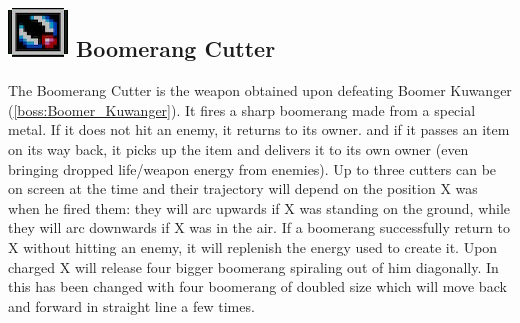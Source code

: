 \subsection{\includegraphics[scale=0.2]{figures/X1/Boomer_kuwanger/Boom_C.png} Boomerang Cutter}\label{Boomerang_cutter}
The Boomerang Cutter is the weapon obtained upon defeating Boomer Kuwanger (\ref{boss:Boomer_Kuwanger}). It fires a sharp boomerang made from a special metal. If it does not hit an enemy, it returns to its owner. and if it passes an item on its way back, it picks up the	item and delivers it to its own owner (even bringing dropped life/weapon energy from enemies). Up to three cutters can be on screen at the time\cite{wiki:Boomerang_cutter} and their trajectory will depend on the position X was when he fired them: they will arc upwards if X was standing on the ground, while they will arc downwards if X was in the air. If a boomerang successfully return to X without hitting an enemy, it will replenish the energy used to create it. Upon charged X will release four bigger boomerang spiraling out of him diagonally. In \mhx this has been changed with four boomerang of doubled size which will move back and forward in straight line a few times. 

